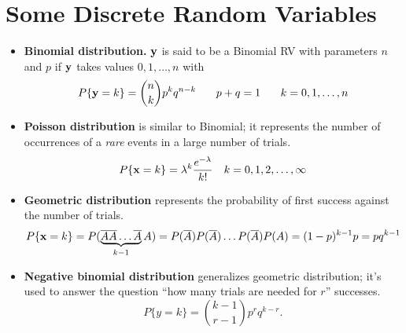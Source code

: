 \documentclass[a4paper, oneside]{book}
\begin{document}
\section{Some Discrete Random Variables}
\begin{itemize}
\item \textbf{Binomial distribution.} $\mathbf y$ is said to be a Binomial RV with parameters $n$ and $p$ if $\mathbf y$ takes values $0,1,\hdots, n$ with %
$$ P\{\mathbf y = k\} = \binom nk p^k q^{n-k}\,\,\,\,\,\,\,\,\,\,\, p+q=1\,\,\,\,\,\,\,\,\,\,\,k=0,1,\hdots,n $$
\item \textbf{Poisson distribution} is similar to Binomial; it represents the number of occurrences of a \textit{rare} events in a large number of trials.  $$P\{\mathbf x = k\} = \lambda^k \frac{e^{-\lambda}}{k!}\,\,\,\,\,\, k=0,1,2,\hdots,\infty$$
\item \textbf{Geometric distribution} represents the probability of first success against the number of trials. $$P\{\mathbf x = k\} = P(\underbrace{\overline{A}\overline{A}\hdots\overline{A}}_{k-1}A) = P(\overline{A})P(\overline{A})\hdots P(\overline{A}) P(A) = (1-p)^{k-1}p =  pq^{k-1} $$
\item \textbf{Negative binomial distribution} generalizes geometric distribution; it's used to answer the question ``how many trials are needed for $r$'' successes. $$P\{y=k\} = \binom{k-1}{r-1}p^r q^{k-r}.$$
\end{itemize}
\end{document}
